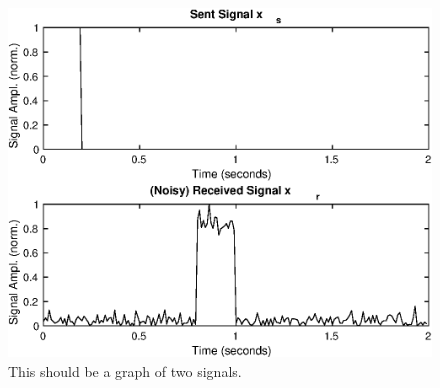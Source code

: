 \documentclass{article}
\begin{document}
\begin{figure}
    \centering
    \includegraphics[width=\textwidth]{signals}
    \caption{This should be a graph of two signals.}
\end{figure}
\end{document}
